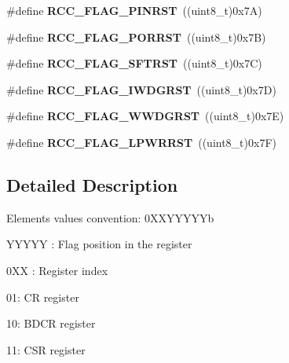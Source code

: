 \begin{DoxyCompactItemize}
\#define {\bfseries R\+C\+C\+\_\+\+F\+L\+A\+G\+\_\+\+P\+I\+N\+R\+ST}~((uint8\+\_\+t)0x7\+A)
\item 
\mbox{\label{group___r_c_c___flag_ga39ad309070f416720207eece5da7dc2c}} 
\#define {\bfseries R\+C\+C\+\_\+\+F\+L\+A\+G\+\_\+\+P\+O\+R\+R\+ST}~((uint8\+\_\+t)0x7\+B)
\item 
\mbox{\label{group___r_c_c___flag_gaf7852615e9b19f0b2dbc8d08c7594b52}} 
\#define {\bfseries R\+C\+C\+\_\+\+F\+L\+A\+G\+\_\+\+S\+F\+T\+R\+ST}~((uint8\+\_\+t)0x7\+C)
\item 
\mbox{\label{group___r_c_c___flag_gaac46bac8a97cf16635ff7ffc1e6c657f}} 
\#define {\bfseries R\+C\+C\+\_\+\+F\+L\+A\+G\+\_\+\+I\+W\+D\+G\+R\+ST}~((uint8\+\_\+t)0x7\+D)
\item 
\mbox{\label{group___r_c_c___flag_gaa80b60b2d497ccd7b7de1075009999a7}} 
\#define {\bfseries R\+C\+C\+\_\+\+F\+L\+A\+G\+\_\+\+W\+W\+D\+G\+R\+ST}~((uint8\+\_\+t)0x7\+E)
\item 
\mbox{\label{group___r_c_c___flag_ga67049531354aed7546971163d02c9920}} 
\#define {\bfseries R\+C\+C\+\_\+\+F\+L\+A\+G\+\_\+\+L\+P\+W\+R\+R\+ST}~((uint8\+\_\+t)0x7\+F)
\end{DoxyCompactItemize}


\subsection{Detailed Description}
Elements values convention\+: 0\+X\+X\+Y\+Y\+Y\+Y\+Yb
\begin{DoxyItemize}
\item Y\+Y\+Y\+YY \+: Flag position in the register
\item 0\+XX \+: Register index
\begin{DoxyItemize}
\item 01\+: CR register
\item 10\+: B\+D\+CR register
\item 11\+: C\+SR register 
\end{DoxyItemize}
\end{DoxyItemize}